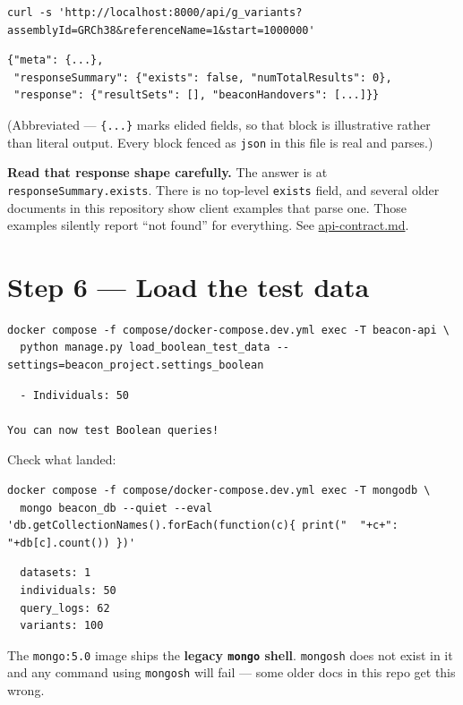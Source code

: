 \documentclass[
  10pt,
]{article}
\begin{document}
\begin{verbatim}
curl -s 'http://localhost:8000/api/g_variants?assemblyId=GRCh38&referenceName=1&start=1000000'
\end{verbatim}

\begin{verbatim}
{"meta": {...},
 "responseSummary": {"exists": false, "numTotalResults": 0},
 "response": {"resultSets": [], "beaconHandovers": [...]}}
\end{verbatim}

(Abbreviated --- \texttt{\{...\}} marks elided fields, so that block is
illustrative rather than literal output. Every block fenced as
\texttt{json} in this file is real and parses.)

\textbf{Read that response shape carefully.} The answer is at
\texttt{responseSummary.exists}. There is no top-level \texttt{exists}
field, and several older documents in this repository show client
examples that parse one. Those examples silently report ``not found''
for everything. See \url{api-contract.md}.

\section{Step 6 --- Load the test data}\label{step-6-load-the-test-data}

\begin{verbatim}
docker compose -f compose/docker-compose.dev.yml exec -T beacon-api \
  python manage.py load_boolean_test_data --settings=beacon_project.settings_boolean
\end{verbatim}

\begin{verbatim}
  - Individuals: 50

You can now test Boolean queries!
\end{verbatim}

Check what landed:

\begin{verbatim}
docker compose -f compose/docker-compose.dev.yml exec -T mongodb \
  mongo beacon_db --quiet --eval 'db.getCollectionNames().forEach(function(c){ print("  "+c+": "+db[c].count()) })'
\end{verbatim}

\begin{verbatim}
  datasets: 1
  individuals: 50
  query_logs: 62
  variants: 100
\end{verbatim}

The \texttt{mongo:5.0} image ships the \textbf{legacy \texttt{mongo}
shell}. \texttt{mongosh} does not exist in it and any command using
\texttt{mongosh} will fail --- some older docs in this repo get this
wrong.
\end{document}
